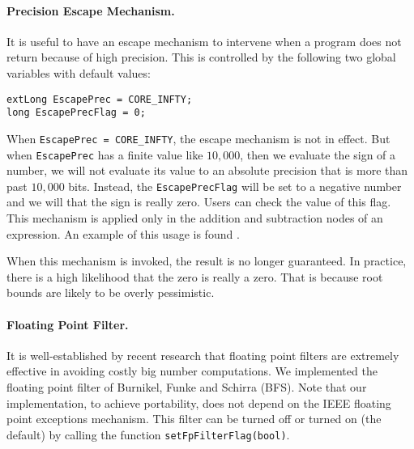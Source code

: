 \documentclass[12pt]{article}
\begin{document}
\paragraph{Precision Escape Mechanism.}
It is useful to have an escape mechanism to intervene
when a program does not return because of high precision.
This is controlled by the following
two global variables with default values:

\begin{progb} {
\> \tt extLong EscapePrec  = CORE\_INFTY; \\
\> \tt long    EscapePrecFlag = 0; \\
}\end{progb}

When {\tt EscapePrec  = CORE\_INFTY}, the escape mechanism
is not in effect.  But when {\tt EscapePrec} has a finite value 
like $10,000$, then we evaluate the sign of a number, we will not
evaluate its value to an absolute precision that is
more than past $10,000$ bits.  Instead, the {\tt EscapePrecFlag} will
be set to a negative number and we will
 that the sign is really zero. 
Users can check the value of this flag.
This mechanism is applied only in the addition and
subtraction nodes of an expression.
An example of this usage is found .

When this mechanism is invoked, the result is no longer guaranteed.
In practice, there is a high likelihood that the  zero
is really a zero.  That is because root bounds are likely to
be overly pessimistic.

\paragraph{Floating Point Filter.}
It is well-established by recent research
that floating point filters are extremely
effective in avoiding costly big number computations.
We implemented the floating point
filter of Burnikel, Funke and Schirra (BFS).
Note that our implementation, to achieve portability, does
not depend on the IEEE floating point exceptions mechanism.
This filter can be turned off or turned on (the default)
by calling the function \texttt{setFpFilterFlag(bool)}.
\end{document}
